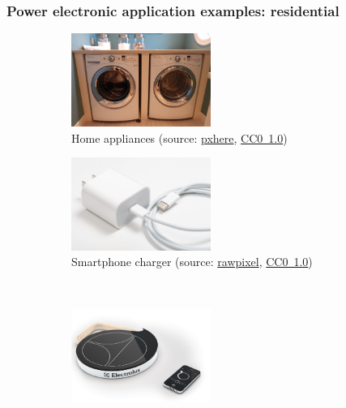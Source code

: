 \begin{frame}[c]
	\frametitle{Power electronic application examples: residential}
	\begin{figure}
		\centering
		\begin{subfigure}[b]{0.49\textwidth}
			\centering
			\includegraphics[width=0.5\textwidth]{fig/lec01/Home_appliance.jpg}
			\caption{Home appliances (source: \href{https://pxhere.com/de/photo/863012}{pxhere}, \href{https://creativecommons.org/publicdomain/zero/1.0/}{CC0~1.0})}
		\end{subfigure}
		\pause
		\hfill
		\begin{subfigure}[b]{0.49\textwidth}
			\centering
			\includegraphics[width=0.5\textwidth]{fig/lec01/Smartphone_charger.jpg}
			\caption{Smartphone charger (source: \href{https://www.rawpixel.com/image/5923136/photo-image-phone-public-domain-white}{rawpixel}, \href{https://creativecommons.org/publicdomain/zero/1.0/}{CC0~1.0})}
		\end{subfigure}
		\pause
		\\
		\begin{subfigure}[b]{0.49\textwidth}
			\centering
			\includegraphics[width=0.5\textwidth]{fig/lec01/Induction_plate.jpg}

\end{subfigure}
\end{figure}
\end{frame}
